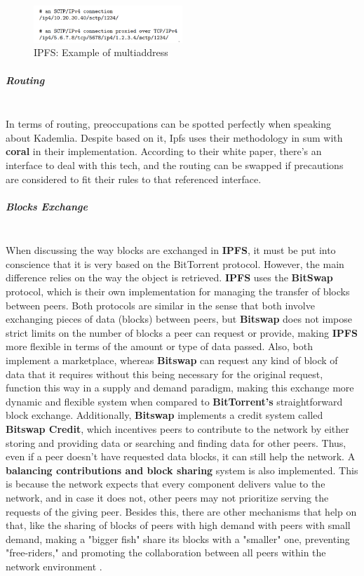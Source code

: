 \begin{figure}[H]
    \centering
    \includegraphics[width=0.5\textwidth]{assets/use-case-1/exampleNet+.png} %
    \caption{IPFS: Example of multiaddress}
    \label{fig:sample-image} 
\end{figure}

\subparagraph{Routing}  \mbox{} \\
In terms of routing, preoccupations can be spotted perfectly when speaking about Kademlia. Despite based on it, Ipfs uses their methodology in sum with \textbf{coral} in their implementation. According to their white paper, there's an interface to deal with this tech, and the routing can be swapped if precautions are considered to fit their rules to that referenced interface.

\subparagraph{Blocks Exchange} \mbox{} \\
When discussing the way blocks are exchanged in \textbf{IPFS}, it must be put into conscience that it is very based on the BitTorrent protocol. However, the main difference relies on the way the object is retrieved. \textbf{IPFS} uses the \textbf{BitSwap} protocol, which is their own implementation for managing the transfer of blocks between peers. Both protocols are similar in the sense that both involve exchanging pieces of data (blocks) between peers, but \textbf{Bitswap} does not impose strict limits on the number of blocks a peer can request or provide, making \textbf{IPFS} more flexible in terms of the amount or type of data passed. Also, both implement a marketplace, whereas \textbf{Bitswap} can request any kind of block of data that it requires without this being necessary for the original request, function this way in a supply and demand paradigm, making this exchange more dynamic and flexible system when compared to \textbf{BitTorrent's} straightforward block exchange. Additionally, \textbf{Bitswap} implements a credit system called \textbf{Bitswap Credit}, which incentives peers to contribute to the network by either storing and providing data or searching and finding data for other peers. Thus, even if a peer doesn't have requested data blocks, it can still help the network. A \textbf{balancing contributions and block sharing} system is also implemented. This is because the network expects that every component delivers value to the network, and in case it does not, other peers may not prioritize serving the requests of the giving peer. Besides this, there are other mechanisms that help on that, like the sharing of blocks of peers with high demand with peers with small demand, making a "bigger fish" share its blocks with a "smaller" one, preventing "free-riders," and promoting the collaboration between all peers within the network environment \cite{bitswap}.

